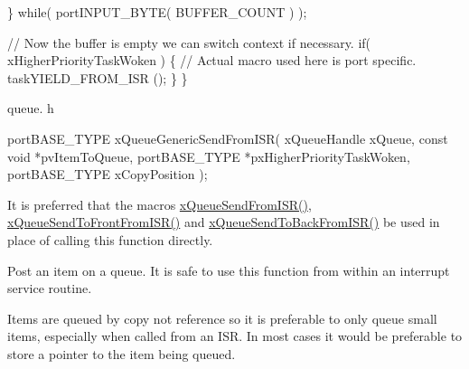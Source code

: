 \begin{DoxyPre}   \} while( portINPUT\_BYTE( BUFFER\_COUNT ) );\end{DoxyPre}



\begin{DoxyPre}   // Now the buffer is empty we can switch context if necessary.
   if( xHigherPriorityTaskWoken )
   \{
    // Actual macro used here is port specific.
    taskYIELD\_FROM\_ISR ();
   \}
\}
\end{DoxyPre}


queue. h 
\begin{DoxyPre}
portBASE\_TYPE xQueueGenericSendFromISR(
                                       xQueueHandle     xQueue,
                                       const    void    *pvItemToQueue,
                                       portBASE\_TYPE    *pxHigherPriorityTaskWoken,
                                       portBASE\_TYPE    xCopyPosition
                                   );
\end{DoxyPre}


It is preferred that the macros \hyperlink{queue_8h_a21d5919ed26c21d121df4a4debeb643c}{x\+Queue\+Send\+From\+I\+S\+R()}, \hyperlink{queue_8h_af03b83396462affe9e28302660e7b9c6}{x\+Queue\+Send\+To\+Front\+From\+I\+S\+R()} and \hyperlink{queue_8h_a51e9f73417b11441a181cdc4f33a68e9}{x\+Queue\+Send\+To\+Back\+From\+I\+S\+R()} be used in place of calling this function directly.

Post an item on a queue. It is safe to use this function from within an interrupt service routine.

Items are queued by copy not reference so it is preferable to only queue small items, especially when called from an I\+SR. In most cases it would be preferable to store a pointer to the item being queued.


